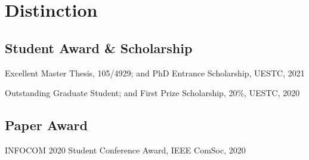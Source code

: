 \section*{Distinction}


\subsection*{\hspace{1.8em}Student Award \& Scholarship}
\indent

Excellent Master Thesis, 105/4929; and PhD Entrance Scholarship, UESTC, 2021

Outstanding Graduate Student; and First Prize Scholarship, 20\%, UESTC, 2020

\subsection*{\hspace{1.8em}Paper Award}
\indent

INFOCOM 2020 Student Conference Award, IEEE ComSoc, 2020

